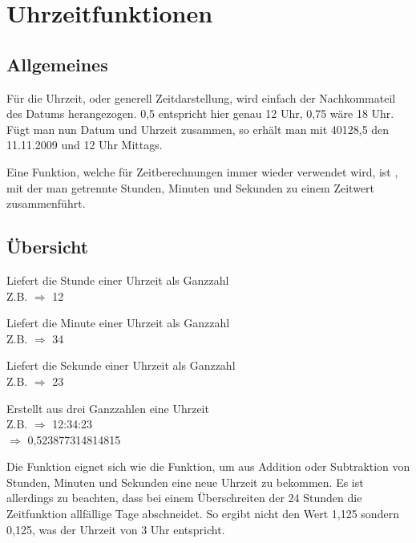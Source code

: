 

\section{Uhrzeitfunktionen}

\subsection{Allgemeines}

Für die Uhrzeit, oder generell Zeitdarstellung, wird einfach der Nachkommateil des Datums herangezogen. 0,5 entspricht hier genau 12 Uhr, 0,75 wäre 18 Uhr. Fügt man nun Datum und Uhrzeit zusammen, so erhält man mit 40128,5 den 11.11.2009 und 12 Uhr Mittags.

Eine Funktion, welche für Zeitberechnungen immer wieder verwendet wird, ist , mit der man getrennte Stunden, Minuten und Sekunden zu einem Zeitwert zusammenführt.



\subsection{Übersicht}
\begin{description}[labelindent=0cm, leftmargin=7cm, font=\mdseries, labelwidth=5cm,style=nextline]
\item[\stmt{STUNDE(\syntax{Uhrzeit})}] Liefert die Stunde einer Uhrzeit als Ganzzahl\\
Z.B.  $\Rightarrow$ 12
\item[\stmt{MINUTE(\syntax{Uhrzeit})}] Liefert die Minute einer Uhrzeit als Ganzzahl\\
Z.B.  $\Rightarrow$ 34
\item[\stmt{SEKUNDE(\syntax{Uhrzeit})}] Liefert die Sekunde einer Uhrzeit als Ganzzahl\\
Z.B.  $\Rightarrow$ 23
\item[\stmt{ZEIT(\syntax{Stunde}; \syntax{Minute}; \syntax{Sekunde}) }] Erstellt aus drei Ganzzahlen eine Uhrzeit\\
Z.B.  $\Rightarrow$ 12:34:23 \\$\Rightarrow$ 0,523877314814815
\end{description}




\begin{infobox}%
Die  Funktion eignet sich wie die Funktion, um aus Addition oder Subtraktion von Stunden, Minuten und Sekunden eine neue Uhrzeit zu bekommen. Es ist allerdings zu beachten, dass bei einem Überschreiten der 24 Stunden die Zeitfunktion allfällige Tage abschneidet. So ergibt  nicht den Wert 1,125 sondern 0,125, was der Uhrzeit von 3 Uhr entspricht.
\end{infobox}


